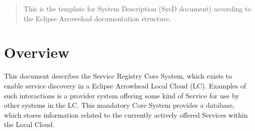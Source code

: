 \documentclass[a4paper]{arrowhead}
\begin{document}
\ArrowheadDate{\today}
\ArrowheadSetup

\begin{center}
  \vspace*{1cm}
  \huge{\arrowtitle}

  \vspace*{0.2cm}
  \LARGE{\arrowtype}
  \vspace*{1cm}

  \vspace*{\fill}


  \vspace*{1cm}
  \vspace*{\fill}

  \begin{abstract}
    This is the template for System Description (SysD document)
    according to the Eclipse Arrowehad documentation structure. 
  \end{abstract}

  \vspace*{1cm}

 \end{center}

\newpage

\tableofcontents
\newpage

\section{Overview}
\label{sec:overview}
\color{black}
This document describes the Service Registry Core System, which exists to enable service discovery in a Eclipse Arrowhead Local Cloud (LC). Examples of such interactions is a provider system offering some kind of Service for use by other systems in the LC. This mandatory Core System provides a database, which stores information related to the currently actively offered Services within the Local Cloud.
\end{document}

